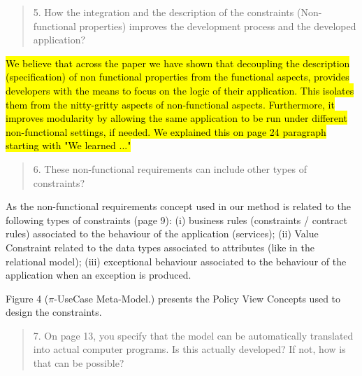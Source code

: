 \documentclass[12pt,a4wide]{article}
\begin{document}
\begin{quotation}\sf\footnotesize

5.	How the integration and the description of the constraints (Non-functional properties) improves the development process and the developed application? 
\end{quotation}

\noindent 
\hl{ We believe that across the paper we have shown that decoupling  the description (specification) of non functional properties from the functional aspects, provides developers with the means to focus on the logic of their application. This isolates them from the nitty-gritty aspects of non-functional aspects. Furthermore, it improves modularity by allowing the same application to be run under different non-functional settings, if needed. We explained this on page 24 paragraph starting with "We learned ..."
}

\begin{quotation}\sf\footnotesize

6.	These non-functional requirements can include other types of constraints? 
\end{quotation}

\noindent 
As the non-functional requirements concept used in our method is related to the following types of constraints (page 9): (i) business rules (constraints / contract rules) associated to the behaviour of the application (services); (ii) Value Constraint related to the data types associated to attributes (like in the relational model); (iii) exceptional behaviour associated to the behaviour of the application when an exception is produced. 


Figure 4 ($\pi$-UseCase Meta-Model.) presents the Policy View Concepts used to design the constraints.

\begin{quotation}\sf\footnotesize

7.	On page 13, you specify that the model can be automatically translated into actual computer programs. Is this actually developed? If not, how is that can be possible? 
\end{quotation}
 
\noindent 
 
\end{document}
